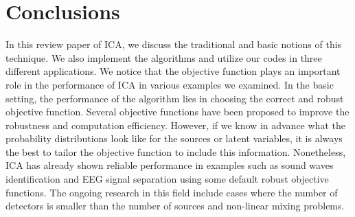 \documentclass[aps,prl,preprint,superscriptaddress]{revtex4-2}
\begin{document}





\section{Conclusions}
In this review paper of ICA, we discuss the traditional and basic notions of this technique. We also implement the algorithms and utilize our codes in three different applications.
We notice that the objective function plays an important role in the performance of ICA in various examples we examined.
In the basic setting, the performance of the algorithm lies in choosing the correct and robust objective function.
Several objective functions have been proposed to improve the robustness and computation efficiency.
However, if we know in advance what the probability distributions look like for the sources or latent variables, it is always the best to tailor the objective function to include this information.
Nonetheless, ICA has already shown reliable performance in examples such as sound waves identification and EEG signal separation using some default robust objective functions.
The ongoing research in this field include cases where the number of detectors is smaller than the number of sources and non-linear mixing problems.

{}
\end{document}
